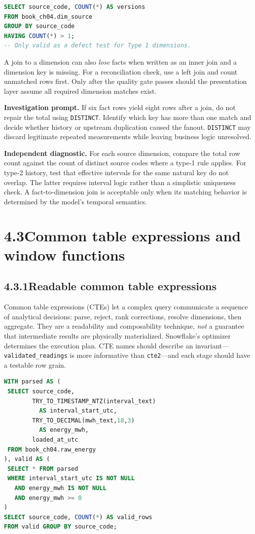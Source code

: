 \documentclass[11pt,twoside]{article}
\newcommand{\topic}[2]{\subsection*{#1\quad #2}}
\begin{document}
\begin{lstlisting}[language=SQL,caption={Detect a dimension key that is not unique.}]
SELECT source_code, COUNT(*) AS versions
FROM book_ch04.dim_source
GROUP BY source_code
HAVING COUNT(*) > 1;
-- Only valid as a defect test for Type 1 dimensions.
\end{lstlisting}

A join to a dimension can also \emph{lose} facts when written as an inner join and a dimension key is missing. For a reconciliation check, use a left join and count unmatched rows first. Only after the quality gate passes should the presentation layer assume all required dimension matches exist.

\textbf{Investigation prompt.} If six fact rows yield eight rows after a join, do not repair the total using \texttt{DISTINCT}. Identify which key has more than one match and decide whether history or upstream duplication caused the fanout. \texttt{DISTINCT} may discard legitimate repeated measurements while leaving business logic unresolved.


\textbf{Independent diagnostic.} For each source dimension, compare the total row count against the count of distinct source codes where a type-1 rule applies. For type-2 history, test that effective intervals for the same natural key do not overlap. The latter requires interval logic rather than a simplistic uniqueness check. A fact-to-dimension join is acceptable only when its matching behavior is determined by the model's temporal semantics.

\newpage
\section*{4.3\quad Common table expressions and window functions}
\topic{4.3.1}{Readable common table expressions}
Common table expressions (CTEs) let a complex query communicate a sequence of analytical decisions: parse, reject, rank corrections, resolve dimensions, then aggregate. They are a readability and composability technique, \emph{not} a guarantee that intermediate results are physically materialized. Snowflake's optimizer determines the execution plan. CTE names should describe an invariant---\texttt{validated\_readings} is more informative than \texttt{cte2}---and each stage should have a testable row grain.

\begin{lstlisting}[language=SQL,caption={Decompose correctness decisions explicitly.}]
WITH parsed AS (
 SELECT source_code,
        TRY_TO_TIMESTAMP_NTZ(interval_text)
          AS interval_start_utc,
        TRY_TO_DECIMAL(mwh_text,18,3)
          AS energy_mwh,
        loaded_at_utc
 FROM book_ch04.raw_energy
), valid AS (
 SELECT * FROM parsed
 WHERE interval_start_utc IS NOT NULL
   AND energy_mwh IS NOT NULL
   AND energy_mwh >= 0
)
SELECT source_code, COUNT(*) AS valid_rows
FROM valid GROUP BY source_code;
\end{lstlisting}
\end{document}
